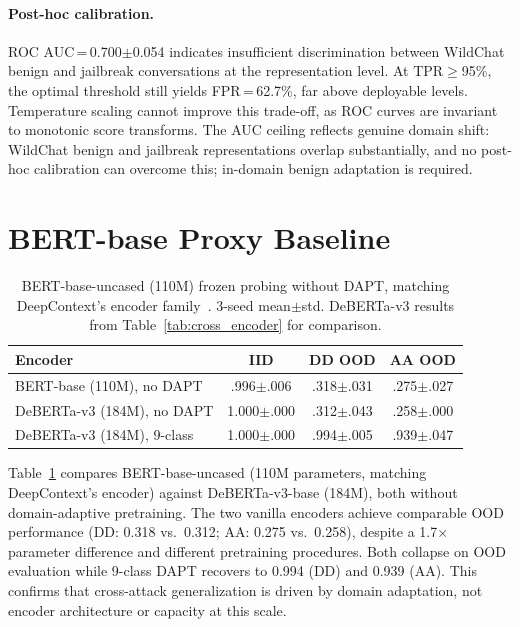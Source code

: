 \paragraph{Post-hoc calibration.}
ROC AUC\,=\,0.700$\pm$0.054 indicates insufficient discrimination between WildChat benign and jailbreak conversations at the representation level. At TPR$\geq$95\%, the optimal threshold still yields FPR\,=\,62.7\%, far above deployable levels. Temperature scaling cannot improve this trade-off, as ROC curves are invariant to monotonic score transforms. The AUC ceiling reflects genuine domain shift: WildChat benign and jailbreak representations overlap substantially, and no post-hoc calibration can overcome this; in-domain benign adaptation is required.

\section{BERT-base Proxy Baseline}
\label{app:bert_proxy}

\begin{table}[ht]
\centering
\footnotesize
\caption{BERT-base-uncased (110M) frozen probing without DAPT, matching DeepContext's encoder family~\citep{deepcontext2026}. 3-seed mean$\pm$std. DeBERTa-v3 results from Table~\ref{tab:cross_encoder} for comparison.}
\label{tab:bert_proxy}
\begin{tabular}{@{}lccc@{}}
\toprule
\textbf{Encoder} & IID & DD OOD & AA OOD \\
\midrule
BERT-base (110M), no DAPT & .996$\pm$.006 & .318$\pm$.031 & .275$\pm$.027 \\
DeBERTa-v3 (184M), no DAPT & 1.000$\pm$.000 & .312$\pm$.043 & .258$\pm$.000 \\
DeBERTa-v3 (184M), 9-class & 1.000$\pm$.000 & .994$\pm$.005 & .939$\pm$.047 \\
\bottomrule
\end{tabular}
\end{table}

Table~\ref{tab:bert_proxy} compares BERT-base-uncased (110M parameters, matching DeepContext's encoder) against DeBERTa-v3-base (184M), both without domain-adaptive pretraining. The two vanilla encoders achieve comparable OOD performance (DD: 0.318 vs.\ 0.312; AA: 0.275 vs.\ 0.258), despite a 1.7$\times$ parameter difference and different pretraining procedures. Both collapse on OOD evaluation while 9-class DAPT recovers to 0.994 (DD) and 0.939 (AA). This confirms that cross-attack generalization is driven by domain adaptation, not encoder architecture or capacity at this scale.

